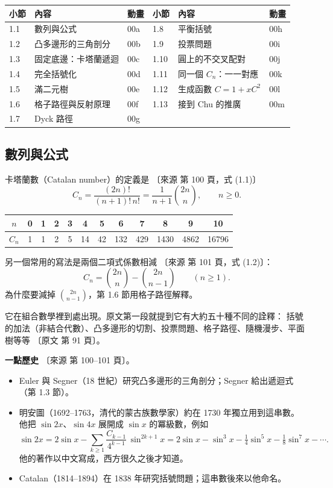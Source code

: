 \documentclass[11pt,a4paper]{article}
\newcommand{\paper}[1]{{\small\color{gray!70!black}〔原文 #1〕}}
\newcommand{\src}[1]{{\small\color{gray!70!black}〔來源 #1〕}}  %
\begin{document}
\begin{center}
\small
\begin{tabular}{@{}lll@{\qquad\qquad}lll@{}}
\toprule
小節 & 內容 & 動畫 & 小節 & 內容 & 動畫\\
\midrule
1.1 & 數列與公式 & 00a & 1.8 & 平衡括號 & 00h\\
1.2 & 凸多邊形的三角剖分 & 00b & 1.9 & 投票問題 & 00i\\
1.3 & 固定底邊：卡塔蘭遞迴 & 00c & 1.10 & 圓上的不交叉配對 & 00j\\
1.4 & 完全括號化 & 00d & 1.11 & 同一個 $C_n$：一一對應 & 00k\\
1.5 & 滿二元樹 & 00e & 1.12 & 生成函數 $C=1+xC^2$ & 00l\\
1.6 & 格子路徑與反射原理 & 00f & 1.13 & 接到 Chu 的推廣 & 00m\\
1.7 & Dyck 路徑 & 00g & & & \\
\bottomrule
\end{tabular}
\end{center}

\subsection{數列與公式}

卡塔蘭數（Catalan number）的定義是 \src{第 100 頁，式 (1.1)}
\[
C_n=\frac{(2n)!}{(n+1)!\,n!}=\frac{1}{n+1}\binom{2n}{n},\qquad n\ge 0 .
\]
\begin{center}
\begin{tabular}{c|ccccccccccc}
$n$ & 0 & 1 & 2 & 3 & 4 & 5 & 6 & 7 & 8 & 9 & 10\\
\hline
$C_n$ & 1 & 1 & 2 & 5 & 14 & 42 & 132 & 429 & 1430 & 4862 & 16796
\end{tabular}
\end{center}
另一個常用的寫法是兩個二項式係數相減 \src{第 101 頁，式 (1.2)}：
\[
C_n=\binom{2n}{n}-\binom{2n}{n-1}\qquad(n\ge1).
\]
為什麼要減掉 $\binom{2n}{n-1}$，第 1.6 節用格子路徑解釋。

它在組合數學裡到處出現。原文第一段就提到它有大約五十種不同的詮釋：
括號的加法（非結合代數）、凸多邊形的切割、投票問題、格子路徑、隨機漫步、平面樹等等 \paper{第 91 頁}。

\textbf{一點歷史} \src{第 100--101 頁}。
\begin{itemize}
  \item Euler 與 Segner（18 世紀）研究凸多邊形的三角剖分；Segner 給出遞迴式（第 1.3 節）。
  \item 明安圖（1692--1763，清代的蒙古族數學家）約在 1730 年獨立用到這串數。
        他把 $\sin 2x$、$\sin 4x$ 展開成 $\sin x$ 的冪級數，例如
        \[
        \sin 2x=2\sin x-\sum_{k\ge1}\frac{C_{k-1}}{4^{k-1}}\,\sin^{2k+1}x
        =2\sin x-\sin^3x-\tfrac14\sin^5x-\tfrac18\sin^7x-\cdots .
        \]
        他的著作以中文寫成，西方很久之後才知道。
  \item Catalan（1814--1894）在 1838 年研究括號問題；這串數後來以他命名。
\end{itemize}
\end{document}
